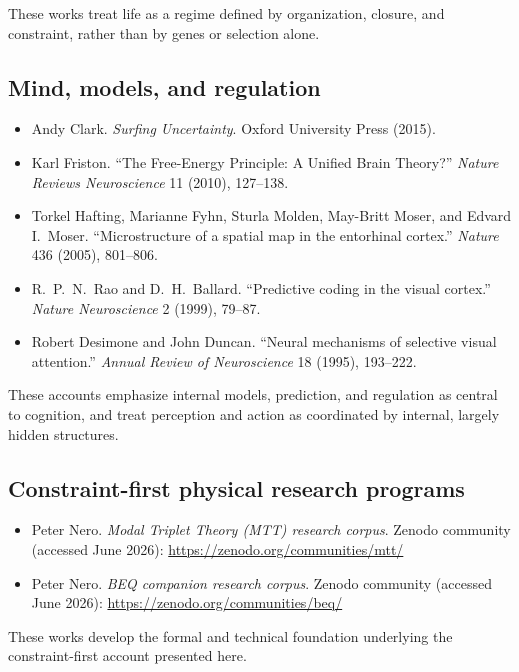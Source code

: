 \documentclass[11pt,twoside,openright]{book}
\begin{document}
\noindent
These works treat life as a regime defined by organization, closure, and
constraint, rather than by genes or selection alone.

\medskip

\subsection*{Mind, models, and regulation}

\begin{itemize}
  \setlength{\itemsep}{0.2em}
  \setlength{\parskip}{0pt}
  \item Andy Clark. \emph{Surfing Uncertainty}. Oxford University Press (2015).
  \item Karl Friston. ``The Free-Energy Principle: A Unified Brain Theory?'' \emph{Nature Reviews Neuroscience} 11 (2010), 127--138.
  \item Torkel Hafting, Marianne Fyhn, Sturla Molden, May-Britt Moser, and Edvard I.\ Moser. ``Microstructure of a spatial map in the entorhinal cortex.'' \emph{Nature} 436 (2005), 801--806.
  \item R.\ P.\ N.\ Rao and D.\ H.\ Ballard. ``Predictive coding in the visual cortex.'' \emph{Nature Neuroscience} 2 (1999), 79--87.
  \item Robert Desimone and John Duncan. ``Neural mechanisms of selective visual attention.'' \emph{Annual Review of Neuroscience} 18 (1995), 193--222.
\end{itemize}

\noindent
These accounts emphasize internal models, prediction, and regulation as central
to cognition, and treat perception and action as coordinated by internal,
largely hidden structures.

\medskip

\subsection*{Constraint-first physical research programs}

\begin{itemize}
  \setlength{\itemsep}{0.25em}
  \setlength{\parskip}{0pt}
  \item Peter Nero. \emph{Modal Triplet Theory (MTT) research corpus}. Zenodo community (accessed June 2026): \url{https://zenodo.org/communities/mtt/}
  \item Peter Nero. \emph{BEQ companion research corpus}. Zenodo community (accessed June 2026): \url{https://zenodo.org/communities/beq/}
\end{itemize}

\noindent
These works develop the formal and technical foundation underlying the
constraint-first account presented here.
\end{document}
